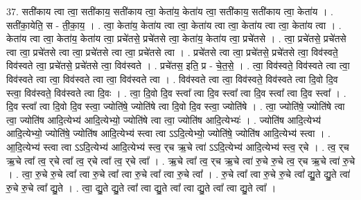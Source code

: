 \documentclass[17pt]{extarticle}
\begin{document}
37. सती॑काय त्वा त्वा॒ सती॑काय॒ सती॑काय त्वा॒ केता॑य॒ केता॑य त्वा॒ सती॑काय॒ सती॑काय त्वा॒ केता॑य । . सती॑का॒येति॒ स - ती॒का॒य॒ । . त्वा॒ केता॑य॒ केता॑य त्वा त्वा॒ केता॑य त्वा त्वा॒ केता॑य त्वा त्वा॒ केता॑य त्वा । . केता॑य त्वा त्वा॒ केता॑य॒ केता॑य त्वा॒ प्रचे॑तसे॒ प्रचे॑तसे त्वा॒ केता॑य॒ केता॑य त्वा॒ प्रचे॑तसे । . त्वा॒ प्रचे॑तसे॒ प्रचे॑तसे त्वा त्वा॒ प्रचे॑तसे त्वा त्वा॒ प्रचे॑तसे त्वा त्वा॒ प्रचे॑तसे त्वा । . प्रचे॑तसे त्वा त्वा॒ प्रचे॑तसे॒ प्रचे॑तसे त्वा॒ विव॑स्वते॒ विव॑स्वते त्वा॒ प्रचे॑तसे॒ प्रचे॑तसे त्वा॒ विव॑स्वते । . प्रचे॑तस॒ इति॒ प्र - चे॒त॒से॒ । . त्वा॒ विव॑स्वते॒ विव॑स्वते त्वा त्वा॒ विव॑स्वते त्वा त्वा॒ विव॑स्वते त्वा त्वा॒ विव॑स्वते त्वा । . विव॑स्वते त्वा त्वा॒ विव॑स्वते॒ विव॑स्वते त्वा दि॒वो दि॒व स्त्वा॒ विव॑स्वते॒ विव॑स्वते त्वा दि॒वः । . त्वा॒ दि॒वो दि॒व स्त्वा᳚ त्वा दि॒व स्त्वा᳚ त्वा दि॒व स्त्वा᳚ त्वा दि॒व स्त्वा᳚ । . दि॒व स्त्वा᳚ त्वा दि॒वो दि॒व स्त्वा॒ ज्योति॑षे॒ ज्योति॑षे त्वा दि॒वो दि॒व स्त्वा॒ ज्योति॑षे । . त्वा॒ ज्योति॑षे॒ ज्योति॑षे त्वा त्वा॒ ज्योति॑ष आदि॒त्येभ्य॑ आदि॒त्येभ्यो॒ ज्योति॑षे त्वा त्वा॒ ज्योति॑ष आदि॒त्येभ्यः॑ । . ज्योति॑ष आदि॒त्येभ्य॑ आदि॒त्येभ्यो॒ ज्योति॑षे॒ ज्योति॑ष आदि॒त्येभ्य॑ स्त्वा त्वा ऽऽदि॒त्येभ्यो॒ ज्योति॑षे॒ ज्योति॑ष आदि॒त्येभ्य॑ स्त्वा । . आ॒दि॒त्येभ्य॑ स्त्वा त्वा ऽऽदि॒त्येभ्य॑ आदि॒त्येभ्य॑ स्त्व॒ र्‌च ऋ॒चे त्वा॑ ऽऽदि॒त्येभ्य॑ आदि॒त्येभ्य॑ स्त्व॒ र्‌चे । . त्व॒ र्‌च ऋ॒चे त्वा᳚ त्व॒ र्‌चे त्वा᳚ त्व॒ र्‌चे त्वा᳚ त्व॒ र्‌चे त्वा᳚ । . ऋ॒चे त्वा᳚ त्व॒ र्‌च ऋ॒चे त्वा॑ रु॒चे रु॒चे त्व॒ र्‌च ऋ॒चे त्वा॑ रु॒चे । . त्वा॒ रु॒चे रु॒चे त्वा᳚ त्वा रु॒चे त्वा᳚ त्वा रु॒चे त्वा᳚ त्वा रु॒चे त्वा᳚ । . रु॒चे त्वा᳚ त्वा रु॒चे रु॒चे त्वा᳚ द्यु॒ते द्यु॒ते त्वा॑ रु॒चे रु॒चे त्वा᳚ द्यु॒ते । . त्वा॒ द्यु॒ते द्यु॒ते त्वा᳚ त्वा द्यु॒ते त्वा᳚ त्वा द्यु॒ते त्वा᳚ त्वा द्यु॒ते त्वा᳚ । \newline
\end{document}
